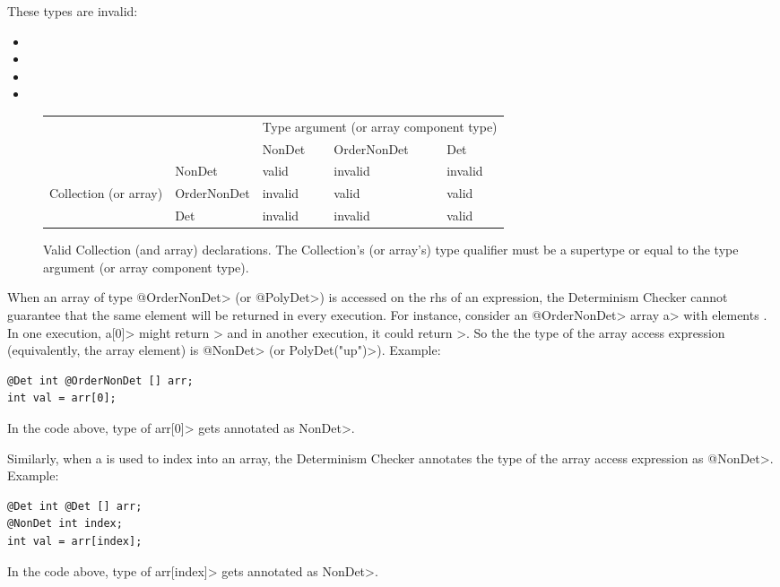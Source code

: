 These types are invalid:
\begin{itemize}
    \item {}
    \item {}
    \item {}
    \item {}
\end{itemize}

\begin{figure}
  \centering
  \begin{tabular}{|l|l|l|l|l|}
    \cline{3-5}
    \multicolumn{2}{c|}{~}  &  \multicolumn{3}{c|}{Type argument (or array component type)} \\ \cline{3-5}
    \multicolumn{2}{c|}{~}  & NonDet     & OrderNonDet & Det \\ \hline
              & NonDet      &   valid    &  invalid    & invalid  \\ \cline{2-5}
Collection (or array)   & OrderNonDet &   invalid  &  valid      & valid  \\ \cline{2-5}
              & Det         &   invalid  &  invalid    & valid      \\ \hline
  \end{tabular}
  \caption{Valid Collection (and array) declarations.  The Collection's (or array's) type qualifier
    must be a supertype or equal to the type argument (or array component type).}
  \label{fig-determinism-collections}
\end{figure}

When an array of type \<@OrderNonDet> (or \<@PolyDet>) is accessed on the rhs of an expression,
the Determinism Checker cannot guarantee that the same element will be returned in every execution. For instance,
consider an \<@OrderNonDet> array \<a> with elements \code{[5,2,8]}. In one execution,
\<a[0]> might return > and in another execution, it could return >.
So the the type of the array access expression (equivalently, the array element) is
\<@NonDet> (or \<PolyDet("up")>). Example:
\begin{Verbatim}
@Det int @OrderNonDet [] arr;
int val = arr[0];
\end{Verbatim}
In the code above, type of \<arr[0]> gets annotated as \<NonDet>.

Similarly, when a  is used to index into an array,
the Determinism Checker annotates the type of the array access expression as \<@NonDet>. Example:
\begin{Verbatim}
@Det int @Det [] arr;
@NonDet int index;
int val = arr[index];
\end{Verbatim}
In the code above, type of \<arr[index]> gets annotated as \<NonDet>.

